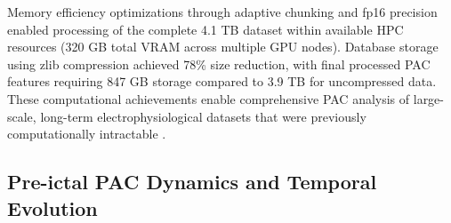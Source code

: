 	Memory efficiency optimizations through adaptive chunking and fp16 precision enabled processing of the complete 4.1 TB dataset within available HPC resources (320 GB total VRAM across multiple GPU nodes). Database storage using zlib compression achieved 78\% size reduction, with final processed PAC features requiring 847 GB storage compared to 3.9 TB for uncompressed data. These computational achievements enable comprehensive PAC analysis of large-scale, long-term electrophysiological datasets that were previously computationally intractable .




\subsection{Pre-ictal PAC Dynamics and Temporal Evolution}

